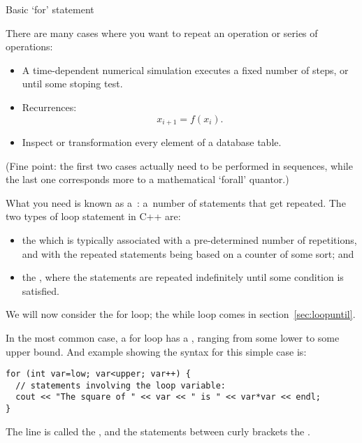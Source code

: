 
 {Basic `for' statement}
\label{sec:for}

There are many cases where you want to repeat an operation or series
of operations:
\begin{itemize}
\item A time-dependent numerical simulation executes a fixed number of
  steps, or until some stoping test.
\item Recurrences: \[ x_{i+1} = f(x_i). \]
\item Inspect or transformation every element of a database table.
\end{itemize}
(Fine point: the first two cases actually need to be performed in
sequences, while the last one corresponds more to a mathematical
`forall' quantor.)

What you need is known as a~: a~number of
statements that get repeated. The two types of loop statement in C++ are:
\begin{itemize}
\item the  which is typically associated with
  a pre-determined number of repetitions, and with the repeated
  statements being based on a counter of some sort; and
\item the , where the statements are
  repeated indefinitely until some condition is satisfied.
\end{itemize}
We will now consider the for loop; the while loop comes in
section~\ref{sec:loopuntil}.

In the most common case, a for loop has a
, ranging from some lower to some upper
bound. And example showing the syntax for this simple case is:
\begin{verbatim}
for (int var=low; var<upper; var++) {
  // statements involving the loop variable:
  cout << "The square of " << var << " is " << var*var << endl;
}
\end{verbatim}
The  line is called the , and the
statements between curly brackets the .

